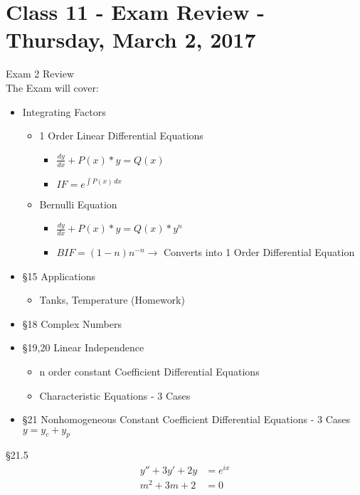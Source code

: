 \chapter{Class 11 - Exam Review - Thursday, March 2, 2017}
\begin{rvw}
Exam 2 Review\\
The Exam will cover:
\begin{itemize}
    \item Integrating Factors
    \begin{itemize}
        \item 1 Order Linear Differential Equations
        \begin{itemize}
            \item $\frac{dy}{dx} +P(x)*y=Q(x)$
            \item $IF = e^{\int P(x)\,dx}$
        \end{itemize}
        \item Bernulli Equation
        \begin{itemize}
            \item $\frac{dy}{dx}+P(x)*y=Q(x)*y^n$
            \item $BIF = (1-n)n^{-n} \rightarrow $ Converts into 1 Order Differential Equation
        \end{itemize}
    \end{itemize}
    \item \S 15 Applications
    \begin{itemize}
        \item Tanks, Temperature (Homework)
    \end{itemize}
    \item \S 18 Complex Numbers
    \item \S 19,20 Linear Independence
    \begin{itemize}
        \item n order constant Coefficient Differential Equations
        \item Characteristic Equations - 3 Cases
    \end{itemize}
    \item \S 21 Nonhomogeneous Constant Coefficient Differential Equations - 3 Cases $y=y_c+y_p$
\end{itemize}
\begin{ex}
\S 21.5\\
\begin{align*}
    y''+3y'+2y&=e^{ix}\\
    m^2+3m+2&=0\\

\end{align*}
\end{ex}
\end{rvw}
